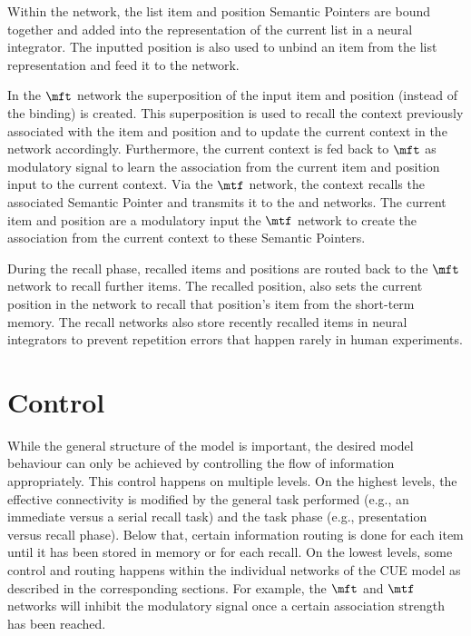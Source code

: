 Within the  network, the list item and position Semantic Pointers are bound together and added into the representation of the current list in a neural integrator.
The inputted position is also used to unbind an item from the list representation and feed it to the  network.

In the $\mft$ network the superposition of the input item and position (instead of the binding) is created.
This superposition is used to recall the context previously associated with the item and position and to update the current context in the  network accordingly.
Furthermore, the current context is fed back to $\mft$ as modulatory signal to learn the association from the current item and position input to the current context.
Via the $\mtf$ network, the context recalls the associated Semantic Pointer and transmits it to the  and  networks.
The current item and position are a modulatory input the $\mtf$ network to create the association from the current context to these Semantic Pointers.

During the recall phase, recalled items and positions are routed back to the $\mft$ network to recall further items.
The recalled position, also sets the current position in the  network to recall that position's item from the  short-term memory.
The recall networks also store recently recalled items in neural integrators to prevent repetition errors that happen rarely in human experiments.



\section{Control}\label{sec:control}
While the general structure of the model is important, the desired model behaviour can only be achieved by controlling the flow of information appropriately.
This control happens on multiple levels.
On the highest levels, the effective connectivity is modified by the general task performed (e.g., an immediate versus a serial recall task) and the task phase (e.g., presentation versus recall phase).
Below that, certain information routing is done for each item until it has been stored in memory or for each recall.
On the lowest levels, some control and routing happens within the individual networks of the CUE model as described in the corresponding sections.
For example, the $\mft$ and $\mtf$ networks will inhibit the modulatory signal once a certain association strength has been reached.

